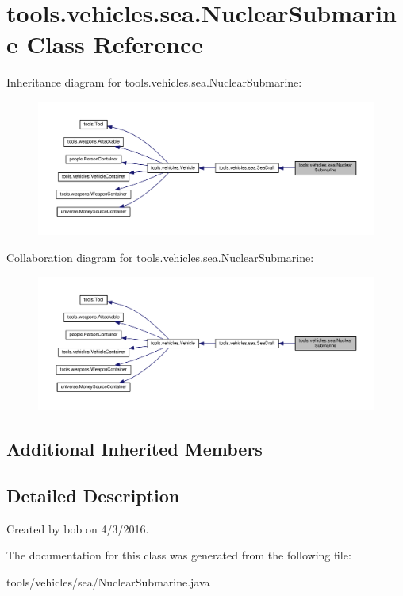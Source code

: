 \hypertarget{classtools_1_1vehicles_1_1sea_1_1_nuclear_submarine}{}\section{tools.\+vehicles.\+sea.\+Nuclear\+Submarine Class Reference}
\label{classtools_1_1vehicles_1_1sea_1_1_nuclear_submarine}


Inheritance diagram for tools.\+vehicles.\+sea.\+Nuclear\+Submarine\+:\nopagebreak
\begin{figure}[H]
\begin{center}
\leavevmode
\includegraphics[width=350pt]{classtools_1_1vehicles_1_1sea_1_1_nuclear_submarine__inherit__graph}
\end{center}
\end{figure}


Collaboration diagram for tools.\+vehicles.\+sea.\+Nuclear\+Submarine\+:\nopagebreak
\begin{figure}[H]
\begin{center}
\leavevmode
\includegraphics[width=350pt]{classtools_1_1vehicles_1_1sea_1_1_nuclear_submarine__coll__graph}
\end{center}
\end{figure}
\subsection*{Additional Inherited Members}


\subsection{Detailed Description}
Created by bob on 4/3/2016. 

The documentation for this class was generated from the following file\+:\begin{DoxyCompactItemize}
\item 
tools/vehicles/sea/Nuclear\+Submarine.\+java\end{DoxyCompactItemize}
